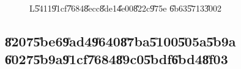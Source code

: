 \begin{figure}[th]
\caption{L\U{5411}\U{91cf}\U{7684}\U{8ecc}\U{8de1}\U{4e00}\U{822c}\U{975e}%
\U{6b63}\U{5713}\U{3002}}
\begin{center}
\end{center}
\end{figure}

\subsection{\U{8207}\U{5be6}\U{9ad4}\U{9640}\U{87ba}\U{5100}\U{505a}\U{5b9a}%
\U{6027}\U{5b9a}\U{91cf}\U{7684}\U{89c0}\U{5bdf}\U{6bd4}\U{8f03}}

